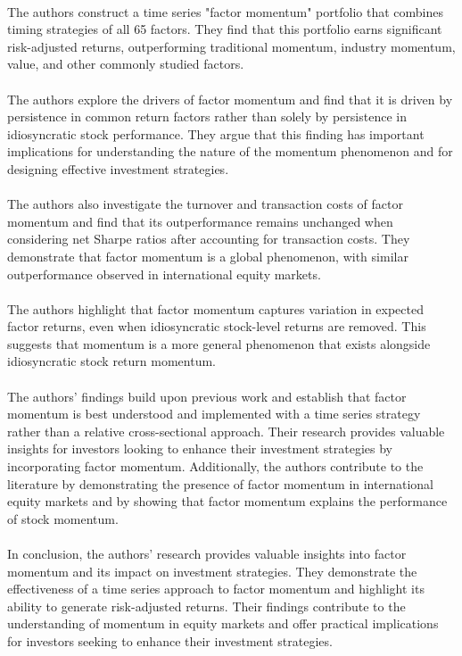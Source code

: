 \documentclass{article}
\begin{document}
\\
The authors construct a time series "factor momentum" portfolio that combines timing strategies of all 65 factors. They find that this portfolio earns significant risk-adjusted returns, outperforming traditional momentum, industry momentum, value, and other commonly studied factors. \\
\\
The authors explore the drivers of factor momentum and find that it is driven by persistence in common return factors rather than solely by persistence in idiosyncratic stock performance. They argue that this finding has important implications for understanding the nature of the momentum phenomenon and for designing effective investment strategies. \\
\\
The authors also investigate the turnover and transaction costs of factor momentum and find that its outperformance remains unchanged when considering net Sharpe ratios after accounting for transaction costs. They demonstrate that factor momentum is a global phenomenon, with similar outperformance observed in international equity markets. \\
\\
The authors highlight that factor momentum captures variation in expected factor returns, even when idiosyncratic stock-level returns are removed. This suggests that momentum is a more general phenomenon that exists alongside idiosyncratic stock return momentum. \\
\\
The authors' findings build upon previous work and establish that factor momentum is best understood and implemented with a time series strategy rather than a relative cross-sectional approach. Their research provides valuable insights for investors looking to enhance their investment strategies by incorporating factor momentum. Additionally, the authors contribute to the literature by demonstrating the presence of factor momentum in international equity markets and by showing that factor momentum explains the performance of stock momentum. \\
\\
In conclusion, the authors' research provides valuable insights into factor momentum and its impact on investment strategies. They demonstrate the effectiveness of a time series approach to factor momentum and highlight its ability to generate risk-adjusted returns. Their findings contribute to the understanding of momentum in equity markets and offer practical implications for investors seeking to enhance their investment strategies. 
\end{document}
